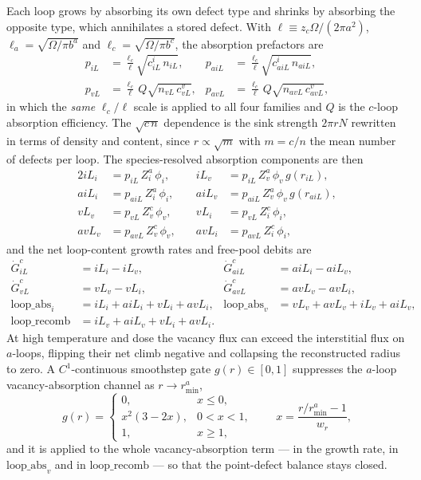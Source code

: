 \documentclass{article}
\begin{document}
Each loop grows by absorbing its own defect type and shrinks by absorbing the
opposite type, which annihilates a stored defect. With $\ell\equiv z_c\Omega/(2\pi
a^2)$, $\ell_a=\sqrt{\Omega/\pi b^a}$ and $\ell_c=\sqrt{\Omega/\pi b^c}$, the
absorption prefactors are
\begin{align}
p_{iL} &=\frac{\ell_c}{\ell}\sqrt{c_{iL}^{i}\,n_{iL}}, &
p_{aiL}&=\frac{\ell_c}{\ell}\sqrt{c_{aiL}^{i}\,n_{aiL}},\\
p_{vL} &=\frac{\ell_c}{\ell}\,Q\sqrt{n_{vL}\,c_{vL}^{v}}, &
p_{avL}&=\frac{\ell_c}{\ell}\,Q\sqrt{n_{avL}\,c_{avL}^{v}},
\label{eq:loopabs}
\end{align}
in which the \emph{same} $\ell_c/\ell$ scale is applied to all four families and
$Q$ is the $c$-loop absorption efficiency. The $\sqrt{c\,n}$ dependence is the sink
strength $2\pi rN$ rewritten in terms of density and content, since
$r\propto\sqrt{m}$ with $m=c/n$ the mean number of defects per loop. The
species-resolved absorption components are then
\begin{alignat}{2}
iL_i  &= p_{iL}\,Z_i^{a}\,\phi_i, &\quad
iL_v  &= p_{iL}\,Z_v^{a}\,\phi_v\,g(r_{iL}),\\
aiL_i &= p_{aiL}\,Z_i^{a}\,\phi_i, &\quad
aiL_v &= p_{aiL}\,Z_v^{a}\,\phi_v\,g(r_{aiL}),\\
vL_v  &= p_{vL}\,Z_v^{c}\,\phi_v, &\quad
vL_i  &= p_{vL}\,Z_i^{c}\,\phi_i,\\
avL_v &= p_{avL}\,Z_v^{c}\,\phi_v, &\quad
avL_i &= p_{avL}\,Z_i^{c}\,\phi_i,
\end{alignat}
and the net loop-content growth rates and free-pool debits are
\begin{align}
\dot{G}_{iL}^{c}&=iL_i-iL_v, &
\dot{G}_{aiL}^{c}&=aiL_i-aiL_v,\\
\dot{G}_{vL}^{c}&=vL_v-vL_i, &
\dot{G}_{avL}^{c}&=avL_v-avL_i,\\
\text{loop\_abs}_i &= iL_i+aiL_i+vL_i+avL_i, &
\text{loop\_abs}_v &= vL_v+avL_v+iL_v+aiL_v, \\
\text{loop\_recomb} &= iL_v+aiL_v+vL_i+avL_i.
\end{align}
At high temperature and dose the vacancy flux can exceed the interstitial flux on
$a$-loops, flipping their net climb negative and collapsing the reconstructed
radius to zero. A $C^1$-continuous smoothstep gate $g(r)\in[0,1]$ suppresses the
$a$-loop vacancy-absorption channel as $r\to r_{\min}^{a}$,
\begin{equation}
g(r)=
\begin{cases}
0, & x\le0,\\
x^2(3-2x), & 0<x<1,\\
1, & x\ge1,
\end{cases}
\qquad x=\frac{r/r_{\min}^{a}-1}{w_{r}},
\end{equation}
and it is applied to the whole vacancy-absorption term --- in the growth rate, in
$\text{loop\_abs}_v$ and in $\text{loop\_recomb}$ --- so that the point-defect
balance stays closed.
\end{document}
